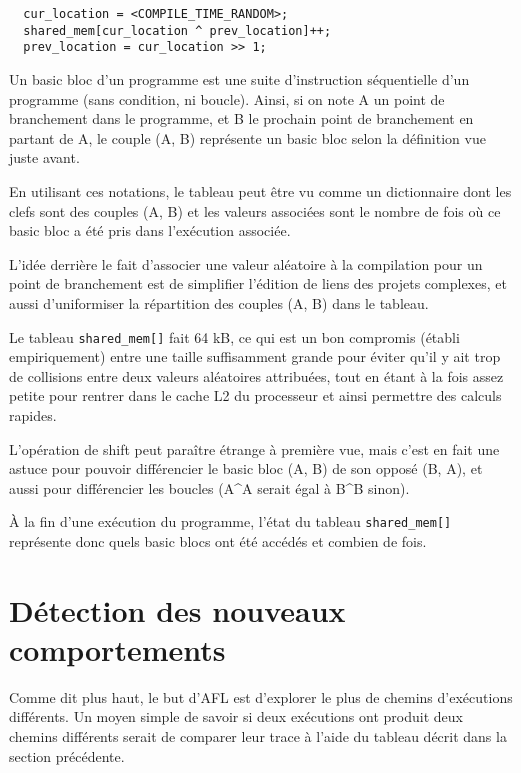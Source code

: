 \begin{lstlisting}
  cur_location = <COMPILE_TIME_RANDOM>;
  shared_mem[cur_location ^ prev_location]++;
  prev_location = cur_location >> 1;
\end{lstlisting}

Un basic bloc d'un programme est une suite d'instruction séquentielle d'un
programme (sans condition, ni boucle). Ainsi, si on note A un point de
branchement dans le programme, et B le prochain point de branchement en
partant de A, le couple (A, B) représente un basic bloc selon la définition 
vue juste avant.

En utilisant ces notations, le tableau  peut être vu
comme un dictionnaire dont les clefs sont des couples (A, B) et les valeurs
associées sont le nombre de fois où ce basic bloc a été pris dans
l'exécution associée.

L'idée derrière le fait d'associer une valeur aléatoire à la compilation
pour un point de branchement est de simplifier l'édition de liens des
projets complexes, et aussi d'uniformiser la répartition des couples
(A, B) dans le tableau.

Le tableau \lstinline{shared_mem[]} fait 64 kB, ce qui est un bon compromis
(établi empiriquement) entre une taille suffisamment grande pour éviter qu'il y
ait trop de collisions entre deux valeurs aléatoires attribuées, tout en
étant à la fois assez petite pour rentrer dans le cache L2 du processeur 
et ainsi permettre des calculs rapides.

L'opération de shift peut paraître étrange à première vue, mais c'est en
fait une astuce pour pouvoir différencier le basic bloc (A, B) de
son opposé (B, A), et aussi pour différencier les boucles
(A\textasciicircum A serait égal à B\textasciicircum B sinon).

À la fin d'une exécution du programme, l'état du tableau
\lstinline{shared_mem[]} représente donc quels basic blocs ont été accédés
et combien de fois.

\section{Détection des nouveaux comportements}\label{nouveaux_comportements}

Comme dit plus haut, le but d'AFL est d'explorer le plus de chemins
d'exécutions différents. Un moyen simple de savoir si deux exécutions
ont produit deux chemins différents serait de comparer leur trace à
l'aide du tableau décrit dans la section précédente.

